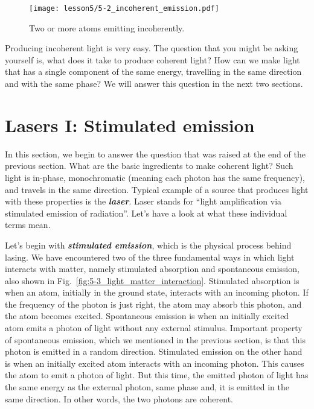 \begin{figure}
    \centering
    \texttt{[image: lesson5/5-2\_incoherent\_emission.pdf]}
    \caption[Incoherent emission.]{Two or more atoms emitting incoherently.}
    \label{fig:5-2_incoherent_emission}
\end{figure}

Producing incoherent light is very easy.
The question that you might be asking yourself is, what does it take to produce coherent light?
How can we make light that has a single component of the same energy, travelling in the same direction and with the same phase?
We will answer this question in the next two sections.


\section{Lasers I: Stimulated emission}
\label{sec:5-3_lasers1}

In this section, we begin to answer the question that was raised at the end of the previous section.
What are the basic ingredients to make coherent light?
Such light is in-phase, monochromatic (meaning each photon has the same frequency), and travels in the same direction.
Typical example of a source that produces light with these properties is the \textbf{\emph{laser}}.
Laser stands for ``light amplification via stimulated emission of radiation''.
Let's have a look at what these individual terms mean.

Let's begin with \textbf{\emph{stimulated emission}}, which is the physical process behind lasing.
We have encountered two of the three fundamental ways in which light interacts with matter, namely stimulated absorption and spontaneous emission, also shown in Fig.~\ref{fig:5-3_light_matter_interaction}.
Stimulated absorption is when an atom, initially in the ground state, interacts with an incoming photon. If the frequency of the photon is just right, the atom may absorb this photon, and the atom becomes excited.
Spontaneous emission is when an initially excited atom emits a photon of light without any external stimulus.
Important property of spontaneous emission, which we mentioned in the previous section, is that this photon is emitted in a random direction.
Stimulated emission on the other hand is when an initially excited atom interacts with an incoming photon.
This causes the atom to emit a photon of light.
But this time, the emitted photon of light has the same energy as the external photon, same phase and, it is emitted in the same direction.
In other words, the two photons are coherent.


